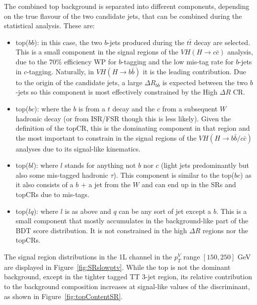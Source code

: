 The combined top background is separated into different components, depending on the true flavour of the two candidate jets, that can be combined during the statistical analysis. These are:
\begin{itemize}
\item top($bb$): in this case, the two $b$-jets produced during the $t\bar{t}$ decay are selected. This is a small component in the signal regions of the $VH(H\rightarrow c\bar{c})$ analysis, due to the 70\% efficiency WP for $b$-tagging and the low mis-tag rate for $b$-jets in $c$-tagging. Naturally, in $VH(H\rightarrow b\bar{b})$ it is the leading contribution. Due to the origin of the candidate jets, a large $\Delta R_{b\bar{b}}$ is expected between the two $b$-jets so this component is most effectively constrained by the High $\Delta R$ CR. 
\item top($bc$): where the $b$ is from a $t$ decay and the $c$ from a subsequent $W$ hadronic decay (or from ISR/FSR though this is less likely). Given the definition of the topCR, this is the dominating component in that region and the most important to constrain in the signal regions of the $VH(H\rightarrow b\bar{b}/c\bar{c})$ analyses due to its signal-like kinematics. 
\item top($bl$): where $l$ stands for anything not $b$ nor $c$ (light jets predominantly but also some mis-tagged hadronic $\tau$). This component is similar to the top($bc$) as it also consists of a $b$ + a jet from the $W$ and can end up in the SRs and topCRs due to mis-tags.
\item top($lq$): where $l$ is as above and $q$ can be any sort of jet except a $b$. This is a small component that mostly accumulates in the background-like part of the BDT score distribution. It is not constrained in the high $\Delta R$ regions nor the topCRs.
\end{itemize}
The signal region distributions in the 1L channel in the $p_T^V$ range $[150, 250]$ GeV are displayed in Figure~\ref{fig:SRslowptv}. While the top is not the dominant background, except in the tighter tagged TT 3-jet region, its relative contribution to the background composition increases at signal-like values of the discriminant, as shown in Figure~\ref{fig:topContentSR}. \\

